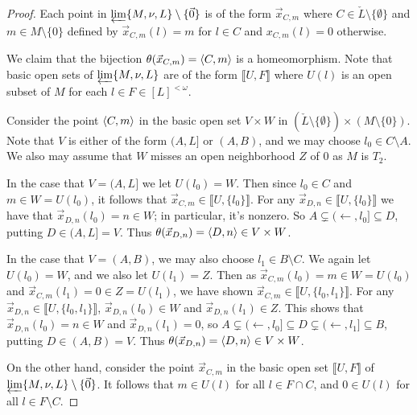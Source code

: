 \documentclass[11pt]{article}
\newcommand{\vect}{\vec}
\newcommand{\lb}{\llbracket}
\newcommand{\rb}{\rrbracket}
\begin{document}
  \begin{proof}
    Each point in \(\varprojlim\{M,\nu,L\}\setminus\{\vect 0\}\) is of the
    form \(\vect x_{C,m}\) where \(C\in\check L\setminus\{\emptyset\}\)
    and \(m\in M\setminus\{0\}\) defined by \(\vect x_{C,m}(l)=m\) for \(l\in C\)
    and \(x_{C,m}(l)=0\) otherwise.

    We claim that the bijection \(\theta(\vect x_{C,m})=\<C,m\>\) is a
    homeomorphism. Note that basic open sets of
    \(\varprojlim\{M,\nu,L\}\) are of the form \(\lb U,F \rb\) where \(U(l)\) is
    an open subset of \(M\) for each \(l\in F\in[L]^{<\omega}\).

    Consider the point \(\langle C,m\rangle\) in the basic open set \(V\times W\) in
    \((\check L\setminus\{\emptyset\})\times(M\setminus\{0\})\). Note that
    \(V\) is either of the form \((A,L]\) or \((A,B)\), and we may choose
    \(l_0\in C\setminus A\). We also may assume that \(W\) misses an open
    neighborhood \(Z\) of \(0\) as \(M\) is \(T_2\).

    In the case that \(V=(A,L]\) we let \(U(l_0)=W\).
    Then since \(l_0\in C\) and \(m\in W=U(l_0)\), it follows that
    \(\vect x_{C,m}\in\lb U,\{l_0\}\rb \).
    For any \(\vect x_{D,n}\in\lb U,\{l_0\}\rb \) we have that \(\vect x_{D,n}(l_0)=n\in W\);
    in particular, it's nonzero. So
    \(A\subsetneq (\leftarrow,l_0]\subseteq D\), putting \(D\in(A,L]=V\). Thus
    \(\theta(\vect x_{D,n})=\<D,n\>\in V\times W\).

    In the case that \(V=(A,B)\), we may also choose \(l_1\in B\setminus C\).
    We again let \(U(l_0)=W\), and we also let \(U(l_1)=Z\). Then as
    \(\vect x_{C,m}(l_0)=m\in W=U(l_0)\) and
    \(\vect x_{C,m}(l_1)=0\in Z=U(l_1)\), we have shown
    \(\vect x_{C,m}\in\lb U,\{l_0,l_1\}\rb \). For any \(\vect x_{D,n}\in\lb U,\{l_0,l_1\}\rb \),
    \(\vect x_{D,n}(l_0)\in W\) and \(\vect x_{D,n}(l_1)\in Z\).
    This shows that \(\vect x_{D,n}(l_0)=n\in W\) and \(\vect x_{D,n}(l_1)=0\), so
    \(
      A
        \subsetneq
      (\leftarrow,l_0]
        \subseteq
      D
        \subsetneq
      (\leftarrow,l_1]
        \subseteq
      B
    \), putting \(D\in(A,B)=V\). Thus
    \(\theta(\vect x_{D,n})=\<D,n\>\in V\times W\).

    On the other hand, consider the point \(\vect x_{C,m}\) in the basic
    open set \(\lb U,F \rb\) of
    \(\varprojlim\{M,\nu,L\}\setminus\{\vect 0\}\).
    It follows that \(m\in U(l)\) for all \(l\in F\cap C\),
    and \(0\in U(l)\) for all \(l\in F\setminus C\).


\end{proof}
\end{document}
